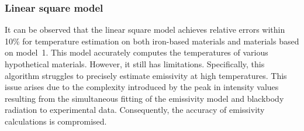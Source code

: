 \subsubsection{Linear square model}
It can be observed that the linear square model achieves relative errors 
within 10\% for temperature estimation on both iron-based materials and materials based on \mbox{model 1}. 
This model accurately computes the temperatures of various hypothetical materials. 
However, it still has limitations. Specifically, this algorithm struggles to precisely 
estimate emissivity at high temperatures. This issue arises due to the complexity introduced 
by the peak in intensity values resulting from the simultaneous fitting of the 
emissivity model and blackbody radiation to experimental data. 
Consequently, the accuracy of emissivity calculations is compromised.


